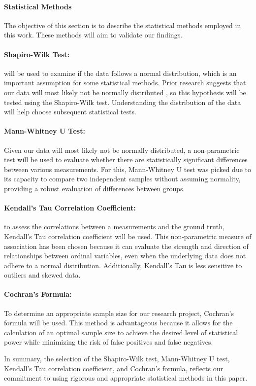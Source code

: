 \paragraph{Statistical Methods}
The objective of this section is to describe the statistical methods employed in this work. These methods will aim to validate our findings.

\paragraph{Shapiro-Wilk Test:} will be used to examine if the data follows a normal distribution, which is an important assumption for some statistical methods. Prior research suggests that our data will most likely not be normally distributed \cite{biksbois}, so this hypothesis will be tested using the Shapiro-Wilk test. Understanding the distribution of the data will help choose subsequent statistical tests.

\paragraph{Mann-Whitney U Test:}
Given our data will most likely not be normally distributed, a non-parametric test will be used to evaluate whether there are statistically significant differences between various measurements. For this, Mann-Whitney U test was picked due to its capacity to compare two independent samples without assuming normality, providing a robust evaluation of differences between groups.

\paragraph{Kendall's Tau Correlation Coefficient:}
to assess the correlations between a measurements and the ground truth, Kendall's Tau correlation coefficient will be used. This non-parametric measure of association has been chosen because it can evaluate the strength and direction of relationships between ordinal variables, even when the underlying data does not adhere to a normal distribution. Additionally, Kendall's Tau is less sensitive to outliers and skewed data.

\paragraph{Cochran's Formula:}
To determine an appropriate sample size for our research project, Cochran's formula will be used. This method is advantageous because it allows for the calculation of an optimal sample size to achieve the desired level of statistical power while minimizing the risk of false positives and false negatives.


In summary, the selection of the Shapiro-Wilk test, Mann-Whitney U test, Kendall's Tau correlation coefficient, and Cochran's formula, reflects our commitment to using rigorous and appropriate statistical methods in this paper.